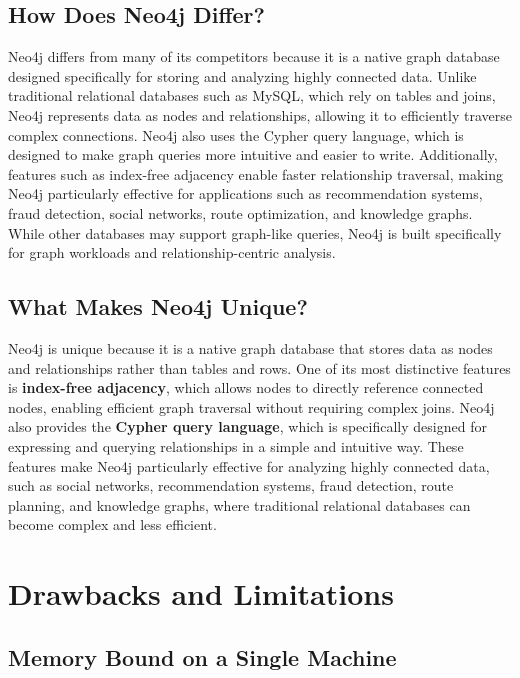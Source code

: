 \documentclass[10pt,a4paper,twocolumn]{article}
\begin{document}
\subsection{How Does Neo4j Differ?}

Neo4j differs from many of its competitors because it is a native graph database designed specifically for storing and analyzing highly connected data. Unlike traditional relational databases such as MySQL, which rely on tables and joins, Neo4j represents data as nodes and relationships, allowing it to efficiently traverse complex connections. Neo4j also uses the Cypher query language, which is designed to make graph queries more intuitive and easier to write. Additionally, features such as index-free adjacency enable faster relationship traversal, making Neo4j particularly effective for applications such as recommendation systems, fraud detection, social networks, route optimization, and knowledge graphs. While other databases may support graph-like queries, Neo4j is built specifically for graph workloads and relationship-centric analysis.

\subsection{What Makes Neo4j Unique?}

Neo4j is unique because it is a native graph database that stores data as nodes and relationships rather than tables and rows. One of its most distinctive features is \textbf{index-free adjacency}, which allows nodes to directly reference connected nodes, enabling efficient graph traversal without requiring complex joins. Neo4j also provides the \textbf{Cypher query language}, which is specifically designed for expressing and querying relationships in a simple and intuitive way. These features make Neo4j particularly effective for analyzing highly connected data, such as social networks, recommendation systems, fraud detection, route planning, and knowledge graphs, where traditional relational databases can become complex and less efficient.

\section{Drawbacks and Limitations}

\subsection{Memory Bound on a Single Machine}
\end{document}

